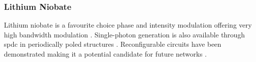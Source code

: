 



\subsubsection*{Lithium Niobate}

Lithium niobate is a favourite choice phase and intensity modulation offering very high bandwidth modulation \cite{Louay2001Advances, Atsushi2010NRZ}. Single-photon generation is also available through \ac{spdc} in periodically poled structures \cite{tanzilli2002ppln}. Reconfigurable circuits have been demonstrated making it a potential candidate for future networks \cite{jin2014chip}. 








